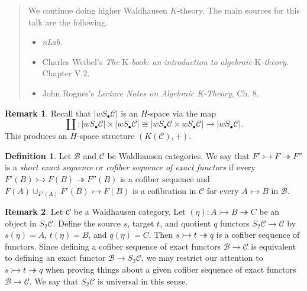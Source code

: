 \documentclass[10pt,letterpaper,cm]{nupset}
\theoremstyle{definition}
\newtheorem*{definition}{Definition}
\newtheorem{remark}{Remark}
\newcommand{\1}{\mathbf{1}}
\renewcommand{\b}{\mathscr{B}}
\renewcommand{\c}{\mathscr{C}}
\newcommand{\0}{\vec 0}
\begin{document}
\begin{abstract}
We continue doing higher Waldhausen $K$-theory. The main sources for this talk are the following.
\begin{itemize}
\item \textit{nLab}.
\item Charles Weibel's \textit{The} K\textit{-book: an introduction to algebraic} K\textit{-theory}.  Chapter V.2.
\item John Rognes's \textit{Lecture Notes on Algebraic K-Theory}, Ch. 8.
\end{itemize}
\end{abstract}

\begin{remark}
Recall that $|wS_{\bullet} \c|$ is an $H$-space via the map $$\coprod: |wS_{\bullet} \c| \times |wS_{\bullet} \c| \cong |wS_{\bullet} \c \times  wS_{\bullet} \c|\to |wS_{\bullet} \c|.$$ This produces an $H$-space structure $(K(\c), +)$.
\end{remark}

\begin{definition}
Let $\b$ and $\c$ be Waldhausen categories. We say that $F' \rightarrowtail F \twoheadrightarrow F''$ is a \textit{short exact sequence} or \textit{cofiber sequence of exact functors} if every $F'(B) \rightarrowtail F(B) \twoheadrightarrow F''(B)$ is a cofiber sequence and $F(A) \cup_{F'(A)} F'(B) \rightarrowtail F(B)$ is a cofibration in $\c$ for every $A \rightarrowtail B$ in $\b$.
\end{definition}

\begin{remark}
Let $\c$ be a Waldhausen category. Let $(\eta): A \rightarrowtail B \twoheadrightarrow C$ be an object in $S_2\c$. Define the source $s$, target $t$, and quotient $q$ functors $S_2\c \to \c$ by $s(\eta) = A$, $t(\eta) = B$, and $q(\eta) = C$. Then $s \rightarrowtail t \twoheadrightarrow q$ is a cofiber sequence of functors. Since defining a cofiber sequence of exact functors $\b \to \c$ is equivalent to defining an exact functor $\b \to S_2 \c$, we may restrict our attention to $s \rightarrowtail t \twoheadrightarrow q$ when proving things about a given cofiber sequence of exact functors $\b \to \c$. We say that $S_2\c$ is universal in this sense.
\end{remark}
\end{document}
